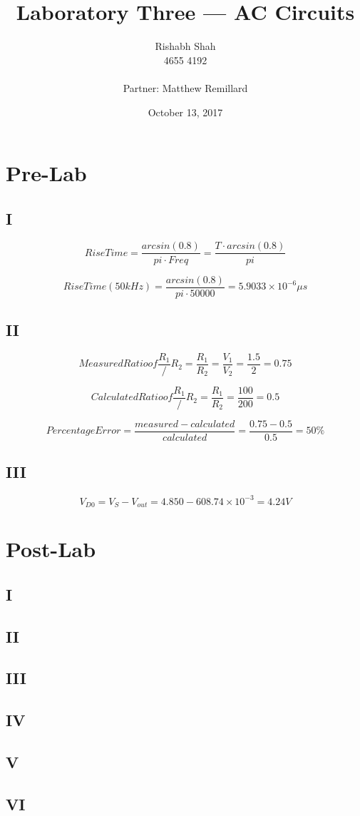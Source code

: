 \documentclass[10pt]{article}
\begin{document}
\title{Laboratory Three --- AC Circuits}
\date{October 13, 2017}
\author{Rishabh Shah\\ 4655 4192\\ \\ Partner: Matthew Remillard}
\maketitle
\newpage

\section*{Pre-Lab}
\subsection*{I}
\noindent$$RiseTime = \frac{arcsin(0.8)}{pi \cdot Freq} = \frac{T \cdot arcsin(0.8)}{pi}$$

\noindent$$RiseTime(50 kHz) = \frac{arcsin(0.8)}{pi \cdot 50000} = 5.9033 \times 10^{-6}\mu s$$

\subsection*{II}
\noindent$$Measured Ratio of \frac{R_1}/{R_2} = \frac{R_1}{R_2} = \frac{V_1}{V_2} = \frac{1.5}{2} = 0.75$$

\noindent$$Calculated Ratio of \frac{R_1}/{R_2} = \frac{R_1}{R_2} = \frac{100}{200} = 0.5$$

\noindent$$Percentage Error = \frac{measured-calculated}{calculated} = \frac{0.75-0.5}{0.5} = 50\%$$

\subsection*{III}
\noindent$$V_{D0} = V_S - V_{out} = 4.850 - 608.74 \times 10^{-3} = 4.24V$$

\section*{Post-Lab}
\subsection*{I}

\subsection*{II}

\subsection*{III}

\subsection*{IV}

\subsection*{V}

\subsection*{VI}
\end{document}
